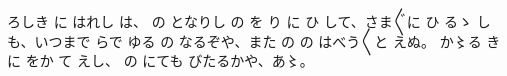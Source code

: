 ろしき
に
はれし
は、
の
となりし
の
を
り
に
ひ
して、さま〴〵に
ひ
るゝ
しも、いつまで
らで
ゆる
の
なるぞや、また
の
の
はべう〳〵と
えぬ。
か〻る
きに
をか
て
えし、
の
にても
びたるかや、あ〻。


